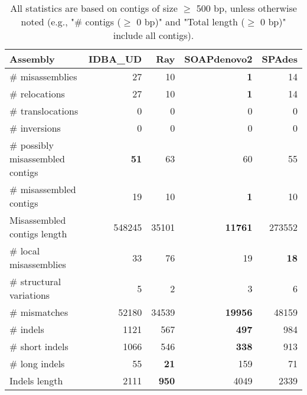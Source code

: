 \documentclass[12pt,a4paper]{article}
\begin{document}
\begin{table}[ht]
\begin{center}
\caption{All statistics are based on contigs of size $\geq$ 500 bp, unless otherwise noted (e.g., "\# contigs ($\geq$ 0 bp)" and "Total length ($\geq$ 0 bp)" include all contigs).}
\begin{tabular}{|l*{4}{|r}|}
\hline
Assembly & IDBA\_UD & Ray & SOAPdenovo2 & SPAdes \\ \hline
\# misassemblies & 27 & 10 & {\bf 1} & 14 \\ \hline
\hspace{5mm}\# relocations & 27 & 10 & {\bf 1} & 14 \\ \hline
\hspace{5mm}\# translocations & 0 & 0 & 0 & 0 \\ \hline
\hspace{5mm}\# inversions & 0 & 0 & 0 & 0 \\ \hline
\# possibly misassembled contigs & {\bf 51} & 63 & 60 & 55 \\ \hline
\# misassembled contigs & 19 & 10 & {\bf 1} & 10 \\ \hline
Misassembled contigs length & 548245 & 35101 & {\bf 11761} & 273552 \\ \hline
\# local misassemblies & 33 & 76 & 19 & {\bf 18} \\ \hline
\# structural variations & 5 & 2 & 3 & 6 \\ \hline
\# mismatches & 52180 & 34539 & {\bf 19956} & 48159 \\ \hline
\# indels & 1121 & 567 & {\bf 497} & 984 \\ \hline
\hspace{5mm}\# short indels & 1066 & 546 & {\bf 338} & 913 \\ \hline
\hspace{5mm}\# long indels & 55 & {\bf 21} & 159 & 71 \\ \hline
Indels length & 2111 & {\bf 950} & 4049 & 2339 \\ \hline
\end{tabular}
\end{center}
\end{table}
\end{document}
